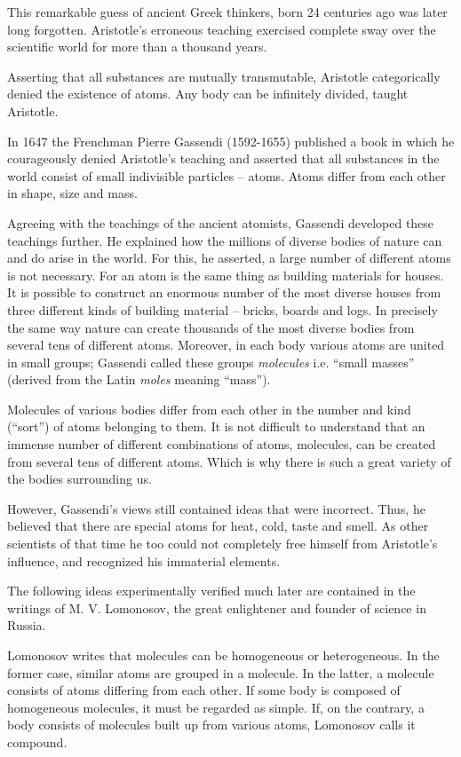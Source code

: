 This remarkable guess of ancient Greek thinkers, born 24 centuries ago was later long forgotten. Aristotle’s erroneous teaching exercised complete sway over the scientific world for more than a thousand years.

Asserting that all substances are mutually transmutable, Aristotle categorically denied the existence of atoms. Any body can be infinitely  divided, taught Aristotle.

In 1647 the Frenchman Pierre Gassendi (1592-1655)
published a book in which he courageously denied Aris­totle’s teaching and asserted that all substances in the world consist of small indivisible particles -- atoms. Atoms differ from each other in shape, size and mass.

Agreeing with the teachings of the ancient atomists, Gassendi developed these teachings further. He explained how the millions of diverse bodies of nature can and do arise in the world. For this, he asserted, a large number of different atoms is not necessary. For an atom is the same thing as building materials for houses. It is pos­sible to construct an enormous number of the most diverse houses from three different kinds of building mate­rial -- bricks, boards and logs. In precisely the same way nature can create thousands of the most diverse bodies from several tens of different atoms. Moreover, in each body various atoms are united in small groups; Gassendi called these groups \emph{molecules} i.e. ``small masses'' (derived from the Latin \emph{moles} meaning ``mass'').

Molecules of various bodies differ from each other in the number and kind (``sort'') of atoms belonging to them. It is not difficult to understand that an immense number of different combinations of atoms, molecules, can be created from several tens of different atoms. Which is 
why there is such a great variety of the bodies surrounding us.

However, Gassendi’s views still contained ideas that were incorrect. Thus, he believed that there are special atoms for heat, cold, taste and smell. As other scientists of that time he too could not completely free himself from Aristotle’s influence, and recognized his immaterial
elements.

The following ideas experimentally verified much later are contained in the writings of M. V. Lomonosov, the great enlightener and founder of science in Russia. 

Lomonosov writes that molecules can be homogeneous or heterogeneous. In the former case, similar atoms are grouped in a molecule. In the latter, a molecule consists of atoms differing from each other. If some body is composed of homogeneous molecules, it must be regarded as simple. If, on the contrary, a body con­sists of molecules built up from various atoms, Lomo­nosov calls it compound.

